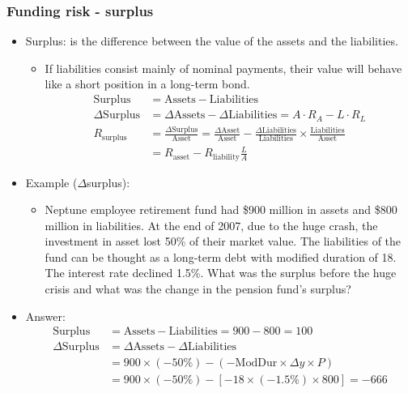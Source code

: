 \subsubsection{Funding risk - surplus}
\begin{itemize}
\item Surplus: is the difference between the value of the assets and the liabilities.
    \begin{itemize}
    \item If liabilities consist mainly of nominal payments, their value will behave like a short position in a long-term bond.
    \begin{align*}
        \text{Surplus} &= \text{Assets} - \text{Liabilities} \\
        \Delta \text{Surplus} &= \Delta \text{Assets} - \Delta \text{Liabilities} = A \cdot R_A - L \cdot R_L \\
        R_{\text{surplus}} &= \frac{\Delta \text{Surplus}}{\text{Asset}} = \frac{\Delta \text{Asset}}{\text{Asset}} - \frac{\Delta \text{Liabilities}}{\text{Liabilities}} \times \frac{\text{Liabilities}}{\text{Asset}} \\
        &= R_{\text{asset}} - R_{\text{liability}} \frac{L}{A}
        \end{align*}
    \end{itemize}
\item Example ($\Delta$surplus):
    \begin{itemize}
    \item Neptune employee retirement fund had \$900 million in assets and \$800 million in liabilities. At the end of 2007, due to the huge crash, the investment in asset lost 50\% of their market value. The liabilities of the fund can be thought as a long-term debt with modified duration of 18. The interest rate declined 1.5\%. What was the surplus before the huge crisis and what was the change in the pension fund's surplus?
    \end{itemize}
    
\item Answer:
\begin{align*}
    \text{Surplus} &= \text{Assets} - \text{Liabilities} = 900 - 800 = 100 \\
    \Delta \text{Surplus} &= \Delta \text{Assets} - \Delta \text{Liabilities} \\
    &= 900 \times (-50\%) - (-\text{ModDur} \times \Delta y \times P) \\
    &= 900 \times (-50\%) - [-18 \times (-1.5\%) \times 800] = -666
    \end{align*}
\end{itemize}








